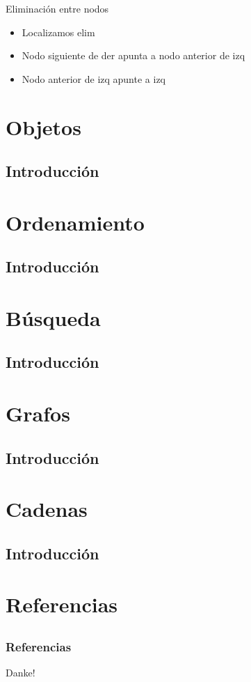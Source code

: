 \documentclass{beamer}
\begin{document}
\begin{frame}{Eliminaci\'on entre nodos}
	\begin{itemize}
		\item Localizamos elim
		\item Nodo siguiente de der apunta a nodo anterior de izq
		\item Nodo anterior de izq apunte a izq
	\end{itemize}
\end{frame}


\section{Objetos}
\subsection{Introducci\'on}

\section{Ordenamiento}
\subsection{Introducci\'on}

\section{B\'usqueda}
\subsection{Introducci\'on}

\section{Grafos}
\subsection{Introducci\'on}

\section{Cadenas}
\subsection{Introducci\'on}

\section{Referencias}
\subsection{}
\begin{frame}[allowframebreaks]
    
    \frametitle{Referencias}
    
    
\end{frame}

\begin{frame}
    \begin{center}
        {\Huge\calligra Danke!}
    \end{center}
\end{frame}
\end{document}
